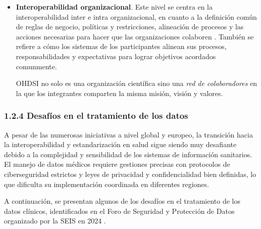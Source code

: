 \begin{itemize}
    \item \textbf{Interoperabilidad organizacional}. Este nivel se centra en la interoperabilidad inter e intra organizacional, en cuanto a la definición común de reglas de negocio, políticas y restricciones, alineación de procesos y las acciones necesarias para hacer que las organizaciones colaboren \parencite{motta2019conceptual}. También se refiere a cómo los sistemas de los participantes alinean sus procesos, responsabilidades y expectativas para lograr objetivos acordados comunmente.

    OHDSI no solo es una organización científica sino una \textit{red de colaboradores} en la que los integrantes comparten la misma misión, visión y valores.

\end{itemize}

\subsubsection{1.2.4 Desafíos en el tratamiento de los datos}


A pesar de las numerosas iniciativas a nivel global y europeo, la transición hacia la interoperabilidad y estandarización en salud sigue siendo muy desafiante debido a la complejidad y sensibilidad de los sistemas de información sanitarios. El manejo de datos médicos requiere gestiones precisas con protocolos de ciberseguridad estrictos y leyes de privacidad y confidencialidad bien definidas, lo que dificulta su implementación coordinada en diferentes regiones.

A continuación, se presentan algunos de los desafíos en el tratamiento de los datos clínicos, identificados en el Foro de Seguridad y Protección de Datos organizado por la SEIS en 2024 \parencite{SEIS2024tercera, SEIS2024octava}.

